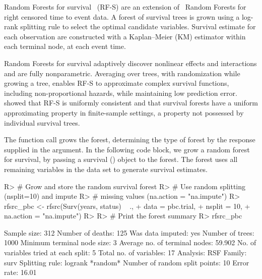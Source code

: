 \documentclass[nojss]{jss}\usepackage[]{graphicx}\usepackage[]{color}
\begin{document}
Random Forests for survival~\citep{Ishwaran:2007, Ishwaran:2008} (RF-S) are an extension of~\cite{Breiman:2001} Random Forests for right censored time to event data. A forest of survival trees is grown using a log-rank splitting rule to select the optimal candidate variables. Survival estimate for each observation are constructed with a Kaplan--Meier (KM) estimator within each terminal node, at each event time. 

Random Forests for survival adaptively discover nonlinear effects and interactions and are fully nonparametric. Averaging over trees, with randomization while growing a tree, enables RF-S to approximate complex survival functions, including non-proportional hazards, while maintaining low prediction error. \cite{Ishwaran:2010a} showed that RF-S is uniformly consistent and that survival forests have a uniform approximating property in finite-sample settings, a property not possessed by individual survival trees.

The   function call grows the forest, determining the type of forest by the response supplied in the  argument. In the following code block, we grow a random forest for survival, by passing a survival () object to the forest. The forest uses all remaining variables in the  data set to generate survival estimates. 

\begin{Schunk}
\begin{Sinput}
R> # Grow and store the random survival forest
R> # Use random splitting (nsplit=10) and impute 
R> # missing values (na.action = "na.impute")
R> rfsrc_pbc <- rfsrc(Surv(years, status) ~ ., 
+                    data = pbc.trial, 
+                    nsplit = 10, 
+                    na.action = "na.impute")
R> 
R> # Print the forest summary
R> rfsrc_pbc
\end{Sinput}
\end{Schunk}

\begin{Schunk}
\begin{Soutput}
                         Sample size: 312
                    Number of deaths: 125
                    Was data imputed: yes
                     Number of trees: 1000
          Minimum terminal node size: 3
       Average no. of terminal nodes: 59.902
No. of variables tried at each split: 5
              Total no. of variables: 17
                            Analysis: RSF
                              Family: surv
                      Splitting rule: logrank *random*
       Number of random split points: 10
                          Error rate: 16.01%
\end{Soutput}
\end{Schunk}
\end{document}
